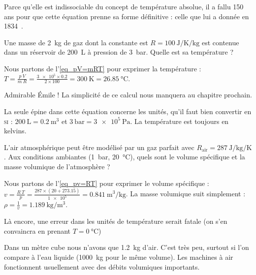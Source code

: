 		Parce qu’elle est indissociable du concept de température absolue, il a fallu 150 ans pour que cette équation prenne sa forme définitive : celle que lui a donnée  en 1834~\cite{clapeyron1834}.

			\begin{anexample}
				Une masse de \SI{2}{\kilogram} de gaz dont la constante est $R = \SI{100}{\joule\per\kelvin\per\kilogram}$ est contenue dans un réservoir de \SI{200}{\liter} à pression de \SI{3}{\bar}. Quelle est sa température ?
				\begin{answer}
					Nous partons de l’\cref{eq_pV=mRT} pour exprimer la température : $T = \frac{p \ V}{m \ R} = \frac{\num{3e5} \times \num{0,2}}{2 \times \num{100}} = \SI{300}{\kelvin} = \SI{26,85}{\degreeCelsius}$.
				\end{answer}
					\begin{remark}Admirable Émile ! La simplicité de ce calcul nous manquera au chapitre prochain.\end{remark}
					\begin{remark}La seule épine dans cette équation concerne les unités, qu’il faut bien convertir en \textsc{si} : $\SI{200}{\liter} = \SI{0,2}{\metre\cubed}$ et $\SI{3}{\bar} = \SI{3e5}{\pascal}$. La température est toujours en \si{kelvins}. \end{remark}
			\end{anexample}

			\begin{anexample}
				L’air atmosphérique peut être modélisé par un gaz parfait avec $R_\text{air} = \SI{287}{\joule\per\kilogram\per\kelvin}$. Aux conditions ambiantes (\SI{1}{\bar}, \SI{20}{\degreeCelsius}), quels sont le volume spécifique et la masse volumique de l’atmosphère ?
				\begin{answer}
					Nous partons de l’\cref{eq_pv=RT} pour exprimer le volume spécifique : $v = \frac{R \ T}{p} = \frac{\num{287} \times (\num{20} + \num{273,15})}{\num{1e5}} = \SI{0,841}{\metre\cubed\per\kilogram}$. La masse volumique suit simplement : $\rho = \frac{1}{v} = \SI{1,189}{\kilogram\per\metre\cubed}$. 
				\end{answer}
					\begin{remark}Là encore, une erreur dans les unités de température serait fatale (on s’en convaincra en prenant $T = \SI{0}{\degreeCelsius}$)\end{remark}
					\begin{remark}Dans un mètre cube nous n’avons que \SI{1,2}{\kilogram} d’air. C’est très peu, surtout si l’on compare à l’eau liquide (\SI{1000}{\kilogram} pour le même volume). Les machines à air fonctionnent usuellement avec des débits volumiques importants.\end{remark}
			\end{anexample}



